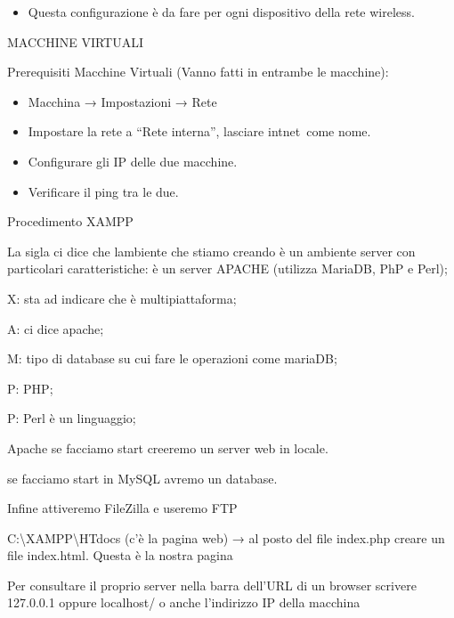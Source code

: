 \documentclass[
]{article}
\providecommand{\tightlist}{%
  \setlength{\itemsep}{0pt}\setlength{\parskip}{0pt}}
\begin{document}
\begin{itemize}
\tightlist
\item
  {Questa configurazione è da fare per ogni dispositivo della rete
  wireless.}
\end{itemize}

{}

{}

{}

{}

{}

{}

{MACCHINE VIRTUALI}

{}

{Prerequisiti Macchine Virtuali (Vanno fatti in entrambe le macchine):}

\begin{itemize}
\tightlist
\item
  {Macchina → Impostazioni → Rete}
\item
  {Impostare la rete a ``Rete interna'', lasciare }{intnet}{~come nome.}
\item
  {Configurare gli IP delle due macchine.}
\item
  {Verificare il ping tra le due.}
\end{itemize}

{}

{}

{Procedimento XAMPP}

{La sigla ci dice che l\textquotesingle ambiente che stiamo creando è un
ambiente server con particolari caratteristiche: è un server APACHE
(utilizza MariaDB, PhP e Perl); }

{X: sta ad indicare che è multipiattaforma;}

{A: ci dice apache;}

{M: tipo di database su cui fare le operazioni come mariaDB;}

{P: PHP;}

{P: Perl è un linguaggio;}

{Apache se facciamo start creeremo un server web in locale.}

{se facciamo start in MySQL avremo un database.}

{Infine attiveremo FileZilla e useremo FTP}

{C:\textbackslash XAMPP\textbackslash HTdocs (c'è la pagina web) → al
posto del file index.php creare un file index.html. Questa è la nostra
pagina}

{Per consultare il proprio server nella barra dell'URL di un browser
scrivere 127.0.0.1 oppure localhost/ o anche l'indirizzo IP della
macchina}
\end{document}
